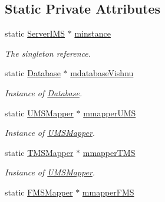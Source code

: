 \subsection*{Static Private Attributes}
\begin{DoxyCompactItemize}
\item 
\hypertarget{classServerIMS_a8651d4564229ee5a5ae78cf7ab49cde6}{
static \hyperlink{classServerIMS}{ServerIMS} $\ast$ \hyperlink{classServerIMS_a8651d4564229ee5a5ae78cf7ab49cde6}{minstance}}
\label{classServerIMS_a8651d4564229ee5a5ae78cf7ab49cde6}

\begin{DoxyCompactList}\small\item\em The singleton reference. \item\end{DoxyCompactList}\item 
\hypertarget{classServerIMS_a63324401a3ad2cb73368d177d70a363c}{
static \hyperlink{classDatabase}{Database} $\ast$ \hyperlink{classServerIMS_a63324401a3ad2cb73368d177d70a363c}{mdatabaseVishnu}}
\label{classServerIMS_a63324401a3ad2cb73368d177d70a363c}

\begin{DoxyCompactList}\small\item\em Instance of \hyperlink{classDatabase}{Database}. \item\end{DoxyCompactList}\item 
\hypertarget{classServerIMS_a0f091757bb574b465911a312829526fa}{
static \hyperlink{classUMSMapper}{UMSMapper} $\ast$ \hyperlink{classServerIMS_a0f091757bb574b465911a312829526fa}{mmapperUMS}}
\label{classServerIMS_a0f091757bb574b465911a312829526fa}

\begin{DoxyCompactList}\small\item\em Instance of \hyperlink{classUMSMapper}{UMSMapper}. \item\end{DoxyCompactList}\item 
\hypertarget{classServerIMS_aa6e0129b746caf04c3f3fb2f6b4a66f8}{
static \hyperlink{classTMSMapper}{TMSMapper} $\ast$ \hyperlink{classServerIMS_aa6e0129b746caf04c3f3fb2f6b4a66f8}{mmapperTMS}}
\label{classServerIMS_aa6e0129b746caf04c3f3fb2f6b4a66f8}

\begin{DoxyCompactList}\small\item\em Instance of \hyperlink{classUMSMapper}{UMSMapper}. \item\end{DoxyCompactList}\item 
\hypertarget{classServerIMS_a7f0a9457f5d188532d7c6d1ef3839061}{
static \hyperlink{classFMSMapper}{FMSMapper} $\ast$ \hyperlink{classServerIMS_a7f0a9457f5d188532d7c6d1ef3839061}{mmapperFMS}}
\label{classServerIMS_a7f0a9457f5d188532d7c6d1ef3839061}


\end{DoxyCompactItemize}
